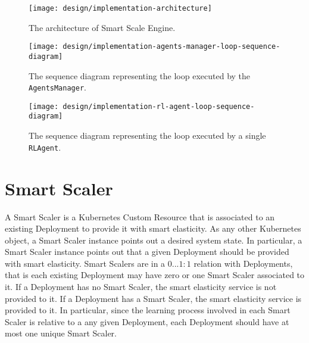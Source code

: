 \clearpage
\vfill
\begin{landscape}
	\begin{figure}	
		\label{fig:implementation-architecture}
		\centering
		\texttt{[image: design/implementation-architecture]}
		\caption{The architecture of Smart Scale Engine.}
	\end{figure}
\end{landscape}
\vfill
\clearpage
\vfill
\begin{landscape}
	\begin{figure}	
		\label{fig:implementation-agents-manager-loop-sequence-diagram}
		\centering
		\texttt{[image: design/implementation-agents-manager-loop-sequence-diagram]}
		\caption{The sequence diagram representing the loop executed by the \texttt{AgentsManager}.}
	\end{figure}
\end{landscape}
\vfill
\clearpage
\vfill
\begin{landscape}
	\begin{figure}	
		\label{fig:implementation-rl-agent-loop-sequence-diagram}
		\centering
		\texttt{[image: design/implementation-rl-agent-loop-sequence-diagram]}
		\caption{The sequence diagram representing the loop executed by a single \texttt{RLAgent}.}
	\end{figure}
\end{landscape}
\vfill
\clearpage


\section{Smart Scaler}
\label{sec:implementation-smart-scaler}
%
A Smart Scaler is a Kubernetes Custom Resource that is associated to an existing Deployment to provide it with smart elasticity.
%
As any other Kubernetes object, a Smart Scaler instance points out a desired system state.
%
In particular, a Smart Scaler instance points out that a given Deployment should be provided with smart elasticity.
%
Smart Scalers are in a $0...1:1$ relation with Deployments, that is each existing Deployment may have zero or one Smart Scaler associated to it.
%
If a Deployment has no Smart Scaler, the smart elasticity service is not provided to it.
%
If a Deployment has a Smart Scaler, the smart elasticity service is provided to it.
%
In particular, since the learning process involved in each Smart Scaler is relative to a any given Deployment, each Deployment should have at most one unique Smart Scaler.

